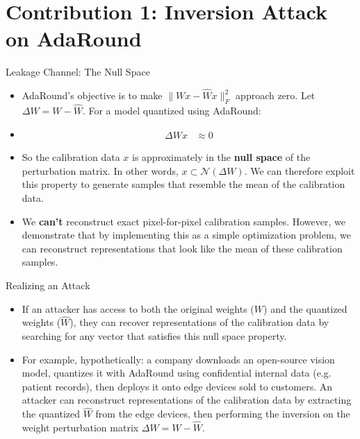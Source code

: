 \documentclass{beamer}
\begin{document}
\section{Contribution 1: Inversion Attack on AdaRound}
\begin{frame}{Leakage Channel: The Null Space}
  \begin{itemize}
    \item AdaRound's objective is to make $\|Wx - \hat{W}x\|_F^2$ approach zero. Let $\Delta W = W - \hat{W}$. For a model quantized using AdaRound:
    \item[] {\Large
    \begin{align*}
        \Delta W x &\approx 0
    \end{align*}
    }
    \item So the calibration data $x$ is approximately in the \textbf{null space} of the perturbation matrix. In other words, $x \subset \mathcal{N}(\Delta W)$. We can therefore exploit this property to generate samples that resemble the mean of the calibration data.
    \item We \textbf{can't} reconstruct exact pixel-for-pixel calibration samples. However, we demonstrate that by implementing this as a simple optimization problem, we can reconstruct representations that look like the mean of these calibration samples.
  \end{itemize}
\end{frame}
\begin{frame}{Realizing an Attack}
  \begin{itemize}
    \item If an attacker has access to both the original weights ($W$) and the quantized weights ($\hat{W}$), they can recover representations of the calibration data by searching for any vector that satisfies this null space property.
    \item For example, hypothetically: a company downloads an open-source vision model, quantizes it with AdaRound using confidential internal data (e.g. patient records), then deploys it onto edge devices sold to customers. An attacker can reconstruct representations of the calibration data by extracting the quantized $\hat{W}$ from the edge devices, then performing the inversion on the weight perturbation matrix $\Delta W = W - \hat{W}$.
  \end{itemize}
  
\end{frame}
\end{document}
